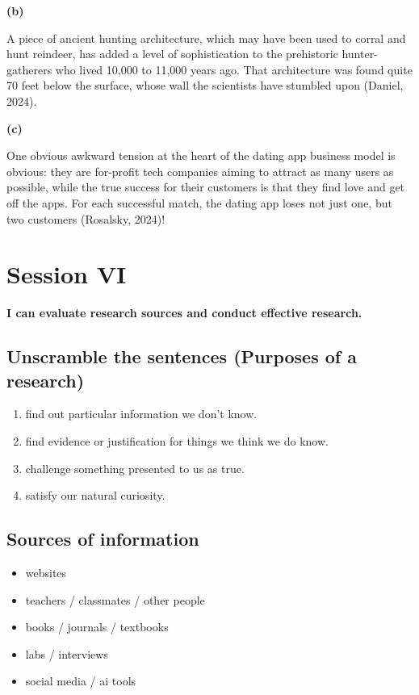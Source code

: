 \documentclass[a4paper]{article}
\begin{document}
\textbf{(b)}

A piece of ancient hunting architecture, which may have been used to corral and hunt reindeer, has added a level of sophistication to the prehistoric hunter-gatherers who lived 10,000 to 11,000 years ago. That architecture was found quite 70 feet below the surface, whose wall the scientists have stumbled upon (Daniel, 2024).

\textbf{(c)}

One obvious awkward tension at the heart of the dating app business model is obvious: they are for-profit tech companies aiming to attract as many users as possible, while the true success for their customers is that they find love and get off the apps. For each successful match, the dating app loses not just one, but two customers (Rosalsky, 2024)!

\section{Session VI}

\textbf{I can evaluate research sources and conduct effective research.}

\subsection{Unscramble the sentences (Purposes of a research)}

\begin{enumerate}
    \item find out particular information we don't know.
    \item find evidence or justification for things we think we do know.
    \item challenge something presented to us as true.
    \item satisfy our natural curiosity. 
\end{enumerate}

\subsection{Sources of information}

\begin{itemize}
    \item websites
    \item teachers / classmates / other people
    \item books / journals / textbooks
    \item labs / interviews
    \item social media / ai tools
\end{itemize}
\end{document}
